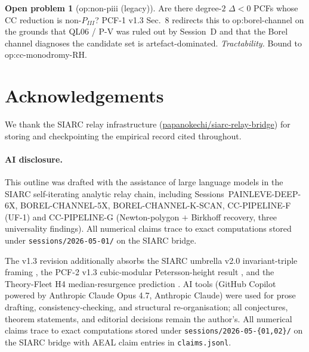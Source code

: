 \documentclass[11pt,reqno]{amsart}
\theoremstyle{plain}
\theoremstyle{definition}
\newtheorem{problem}[theorem]{Open problem}
\theoremstyle{remark}
\newcommand{\CC}{\mathrm{CC}}
\begin{document}
\begin{problem}[\textsf{op:non-piii} (legacy)]
Are there degree-$2$ $\Delta < 0$ PCFs whose $\CC$ reduction
is non-$P_{III}$? PCF-1 v1.3 Sec.~8 redirects this
to \textsf{op:borel-channel} on the grounds that QL06 / P-V
was ruled out by Session~D and that
the Borel channel diagnoses the candidate set is
artefact-dominated.
\emph{Tractability.} Bound to \textsf{op:cc-monodromy-RH}.
\end{problem}

\section*{Acknowledgements}

We thank the SIARC relay infrastructure
(\href{https://github.com/papanokechi/siarc-relay-bridge}%
{papanokechi/siarc-relay-bridge}) for storing and
checkpointing the empirical record cited throughout.

\paragraph{AI disclosure.} This outline was drafted with the
assistance of large language models in the SIARC
self-iterating analytic relay chain, including
Sessions~PAINLEVE-DEEP-6X, BOREL-CHANNEL-5X,
BOREL-CHANNEL-K-SCAN, CC-PIPELINE-F (UF-1) and CC-PIPELINE-G
(Newton-polygon $+$ Birkhoff recovery, three universality
findings). All numerical claims trace to exact computations
stored under \texttt{sessions/2026-05-01/} on the SIARC
bridge.

The v1.3 revision additionally absorbs the SIARC umbrella
v2.0 invariant-triple framing \cite{siarc_umbrella_v2}, the
PCF-2 v1.3 cubic-modular Petersson-height result
\cite{siarc_pcf2_v13}, and the Theory-Fleet H4
median-resurgence prediction
\cite{siarc_theory_fleet_h4}. AI tools (GitHub Copilot
powered by Anthropic Claude Opus 4.7, Anthropic Claude)
were used for prose drafting, consistency-checking, and
structural re-organisation; all conjectures, theorem
statements, and editorial decisions remain the author's.
All numerical claims trace to exact computations stored
under \texttt{sessions/2026-05-\{01,02\}/} on the SIARC
bridge with AEAL claim entries in \texttt{claims.jsonl}.



\end{document}
